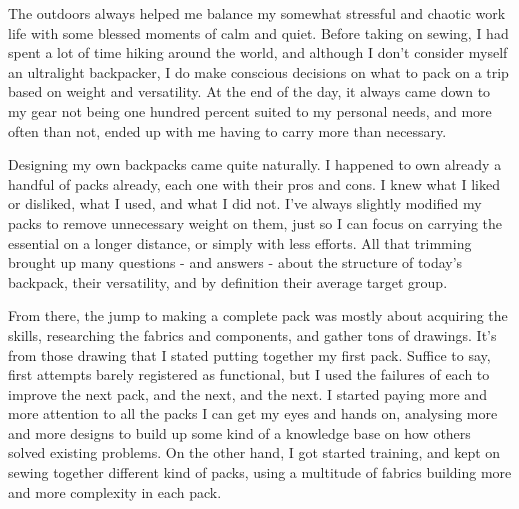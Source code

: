 
The outdoors always helped me balance my somewhat stressful and chaotic work life with some blessed moments of calm and quiet. Before taking on sewing, I had spent a lot of time hiking around the world, and although I don't consider myself an ultralight backpacker, I do make conscious decisions on what to pack on a trip based on weight and versatility. At the end of the day, it always came down to my gear not being one hundred percent suited to my personal needs, and more often than not, ended up with me having to carry more than necessary.

Designing my own backpacks came quite naturally. I happened to own already a handful of packs already, each one with their pros and cons. I knew what I liked or disliked, what I used, and what I did not. I've always slightly modified my packs to remove unnecessary weight on them, just so I can focus on carrying the essential on a longer distance, or simply with less efforts. All that trimming brought up many questions - and answers - about the structure of today's backpack, their versatility, and by definition their average target group.

From there, the jump to making a complete pack was mostly about acquiring the skills, researching the fabrics and components, and gather tons of drawings. It's from those drawing that I stated putting together my first pack. Suffice to say, first attempts barely registered as functional, but I used the failures of each to improve the next pack, and the next, and the next. I started paying more and more attention to all the packs I can get my eyes and hands on, analysing more and more designs to build up some kind of a knowledge base on how others solved existing problems. On the other hand, I got started training, and kept on sewing together different kind of packs, using a multitude of fabrics building more and more complexity in each pack.
